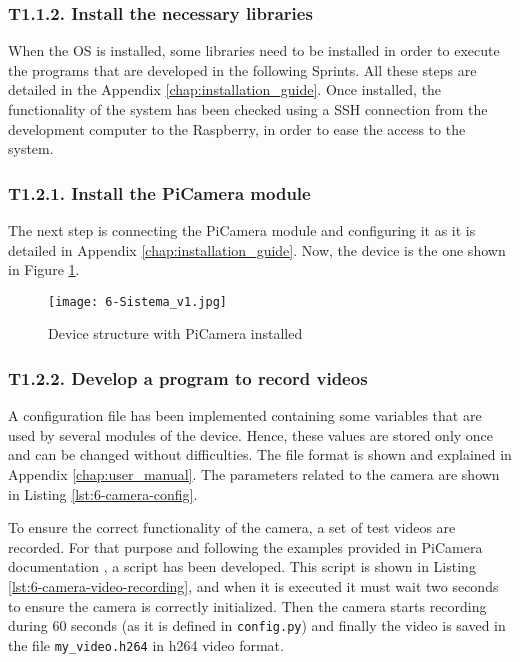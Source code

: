 \subsubsection{T1.1.2. Install the necessary libraries}
When the \ac{OS} is installed, some libraries need to be installed in order to execute the programs that are developed in the following Sprints. All these steps are detailed in the Appendix \ref{chap:installation_guide}. Once installed, the functionality of the system has been checked using a SSH connection from the development computer to the Raspberry, in order to ease the access to the system. 

\subsubsection{T1.2.1. Install the PiCamera module}
The next step is connecting the PiCamera module and configuring it as it is detailed in Appendix \ref{chap:installation_guide}. Now, the device is the one shown in Figure \ref{fig:6-Sistema_v1}. 

\begin{figure}[!h]
	\begin{center}
		\texttt{[image: 6-Sistema\_v1.jpg]}
		\caption{Device structure with PiCamera installed}
		\label{fig:6-Sistema_v1}
	\end{center}
\end{figure}

\subsubsection{T1.2.2. Develop a program to record videos}
A configuration file has been implemented containing some variables that are used by several modules of the device. Hence, these values are stored only once and can be changed without difficulties. The file format is shown and explained in Appendix \ref{chap:user_manual}. The parameters related to the camera are shown in Listing \ref{lst:6-camera-config}.



To ensure the correct functionality of the camera, a set of test videos are recorded. For that purpose and following the examples provided in PiCamera documentation \cite{PiCameraDoc}, a script has been developed. This script is shown in Listing \ref{lst:6-camera-video-recording}, and when it is executed it must wait two seconds to ensure the camera is correctly initialized. Then the camera starts recording during 60 seconds (as it is defined in \texttt{config.py}) and finally the video is saved in the file \texttt{my\_video.h264} in h264 video format.

